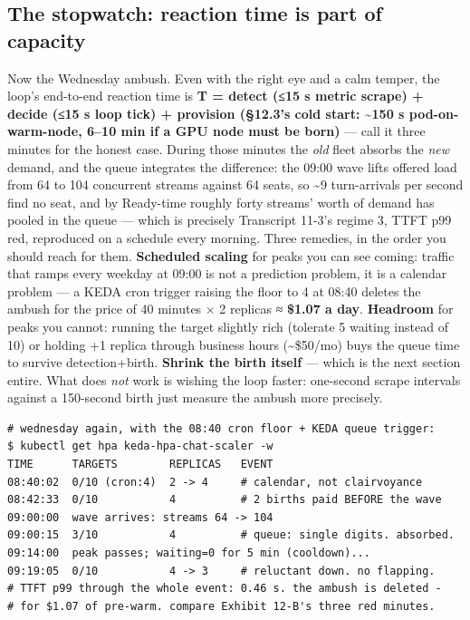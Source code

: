 \subsection*{The stopwatch: reaction time is part of capacity}

Now the Wednesday ambush. Even with the right eye and a calm temper, the loop's end-to-end reaction time is \textbf{T = detect (≤15 s metric scrape) + decide (≤15 s loop tick) + provision (§12.3's cold start: \textasciitilde{}150 s pod-on-warm-node, 6–10 min if a GPU node must be born)} — call it three minutes for the honest case. During those minutes the \textit{old} fleet absorbs the \textit{new} demand, and the queue integrates the difference: the 09:00 wave lifts offered load from 64 to 104 concurrent streams against 64 seats, so \textasciitilde{}9 turn-arrivals per second find no seat, and by Ready-time roughly forty streams' worth of demand has pooled in the queue — which is precisely Transcript 11-3's regime 3, TTFT p99 red, reproduced on a schedule every morning. Three remedies, in the order you should reach for them. \textbf{Scheduled scaling} for peaks you can see coming: traffic that ramps every weekday at 09:00 is not a prediction problem, it is a calendar problem — a KEDA cron trigger raising the floor to 4 at 08:40 deletes the ambush for the price of 40 minutes × 2 replicas ≈ \textbf{\$1.07 a day}. \textbf{Headroom} for peaks you cannot: running the target slightly rich (tolerate 5 waiting instead of 10) or holding +1 replica through business hours (\textasciitilde{}\$50/mo) buys the queue time to survive detection+birth. \textbf{Shrink the birth itself} — which is the next section entire. What does \textit{not} work is wishing the loop faster: one-second scrape intervals against a 150-second birth just measure the ambush more precisely.

\begin{terminalbox}
\begin{Verbatim}[breaklines=true,breakanywhere=true,fontsize=\small,formatcom=\color{tbbtermfg},codes=\tbbcodeactive]
# wednesday again, with the 08:40 cron floor + KEDA queue trigger:
$ kubectl get hpa keda-hpa-chat-scaler -w
TIME      TARGETS        REPLICAS   EVENT
08:40:02  0/10 (cron:4)  2 -> 4     # calendar, not clairvoyance
08:42:33  0/10           4          # 2 births paid BEFORE the wave
09:00:00  wave arrives: streams 64 -> 104
09:00:15  3/10           4          # queue: single digits. absorbed.
09:14:00  peak passes; waiting=0 for 5 min (cooldown)...
09:19:05  0/10           4 -> 3     # reluctant down. no flapping.
# TTFT p99 through the whole event: 0.46 s. the ambush is deleted -
# for $1.07 of pre-warm. compare Exhibit 12-B's three red minutes.
\end{Verbatim}
\end{terminalbox}

